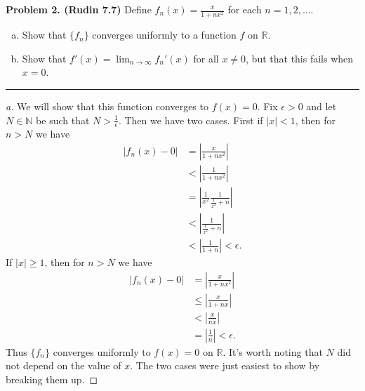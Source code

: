 \documentclass[leqno]{article}
\theoremstyle{nonumberplain}
\newtheorem{proof}{Proof}
\newcommand{\R}{\mathbb{R}}
\begin{document}
\pagebreak



\noindent\textbf{Problem 2. (Rudin 7.7)} Define $f_n (x) = \frac{x}{1+nx^2}$ for each $n=1,2,...$.
\begin{enumerate}[(a)]
\item Show that $\{f_n\}$ converges uniformly to a function $f$ on $\R$.
\item Show that $f'(x)=\lim_{n\to \infty} f_n '(x)$ for all $x\neq 0$, but that this fails when $x=0$.
\end{enumerate}

\noindent\rule[0.5ex]{\linewidth}{1pt}

\begin{proof}[a]
We will show that this function converges to $f(x)=0$.  Fix $\epsilon>0$ and let $N\in \mathbb{N}$ be such that $N>\frac{1}{\epsilon}$.  Then we have two cases.  First if $|x|<1$, then for $n>N$ we have
\begin{align*}
|f_n(x) - 0| &= \left|\frac{x}{1+nx^2}\right|\\
&< \left| \frac{1}{1+nx^2} \right|\\
&=\left| \frac{1}{x^2} \frac{1}{\frac{1}{x^2}+n} \right|\\
&< \left| \frac{1}{\frac{1}{x^2}+n} \right|\\
&< \left| \frac{1}{1+n} \right| < \epsilon.
\end{align*}
If $|x|\geq1$, then for $n>N$ we have
\begin{align*}
|f_n(x)-0| &=\left|\frac{x}{1+nx^2}\right|\\
& \leq \left| \frac{x}{1+nx} \right|\\
&< \left| \frac{x}{nx} \right|\\
&= \left| \frac{1}{n} \right| < \epsilon.
\end{align*}
Thus $\{f_n\}$ converges uniformly to $f(x)=0$ on $\R$. It's worth noting that $N$ did not depend on the value of $x$.  The two cases were just easiest to show by breaking them up.
\end{proof}
\end{document}
